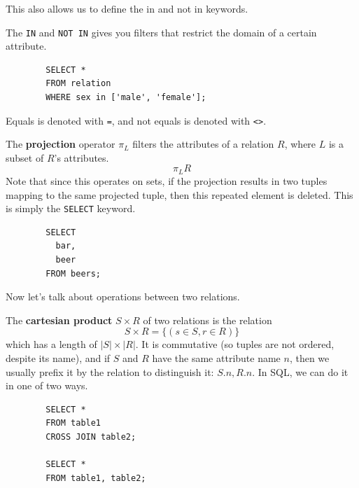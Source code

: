 \documentclass{article}
\begin{document}
    This also allows us to define the in and not in keywords. 

    \begin{definition}
      The \texttt{IN} and \texttt{NOT IN} gives you filters that restrict the domain of a certain attribute. 
      \begin{lstlisting}
        SELECT * 
        FROM relation 
        WHERE sex in ['male', 'female']; 
      \end{lstlisting}
      Equals is denoted with \texttt{=}, and not equals is denoted with \texttt{<>}. 
    \end{definition}

    \begin{definition}[Projection]
      The \textbf{projection} operator $\pi_L$ filters the attributes of a relation $R$, where $L$ is a subset of $R$'s attributes. 
      \begin{equation}
        \pi_L R
      \end{equation}
      Note that since this operates on sets, if the projection results in two tuples mapping to the same projected tuple, then this repeated element is deleted. This is simply the \texttt{SELECT} keyword. 
      \begin{lstlisting}
        SELECT 
          bar,
          beer
        FROM beers; 
      \end{lstlisting}
    \end{definition}

    Now let's talk about operations between two relations. 

    \begin{definition}
      The \textbf{cartesian product} $S \times R$ of two relations is the relation 
      \begin{equation}
        S \times R = \{(s \in S, r \in R)\} 
      \end{equation}
      which has a length of $|S| \times |R|$. It is commutative (so tuples are not ordered, despite its name), and if $S$ and $R$ have the same attribute name $n$, then we usually prefix it by the relation to distinguish it: $S.n, R.n$. In SQL, we can do it in one of two ways. 
      \begin{lstlisting}
        SELECT *
        FROM table1
        CROSS JOIN table2; 

        SELECT *
        FROM table1, table2; 
      \end{lstlisting}
    \end{definition}
\end{document}
